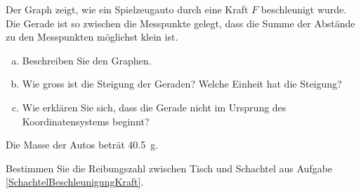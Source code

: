 \documentclass[12pt,a4paper,twoside]{article}
\def\dir{./Aufgaben_Mechanik/}
\newcommand{\Einbinden}[1]{}
\begin{document}
\begin{center}

\end{center}

\begin{aufgabe}
Der Graph zeigt, wie ein Spielzeugauto durch eine Kraft $F$ beschleunigt wurde.
Die Gerade ist so zwischen die Messpunkte gelegt, dass die Summe der Abstände zu den Messpunkten möglichst klein ist.

\begin{enumerate} [a)]
	\item Beschreiben Sie den Graphen.
	\item Wie gross ist die Steigung der Geraden? Welche Einheit hat die Steigung?
	\item Wie erklären Sie sich, dass die Gerade nicht im Ursprung des Koordinatensystems beginnt?
\end{enumerate}
Die Masse der Autos beträt \SI{40.5}{g}.

\end{aufgabe}

\Einbinden{\dir/dynamik02.tex}
\Einbinden{\dir/newton02.tex}
\Einbinden{\dir/newton03.tex}

\newpage

\begin{aufgabe}
	Bestimmen Sie die Reibungszahl zwischen Tisch und Schachtel aus Aufgabe \ref{SchachtelBeschleunigungKraft}.
\end{aufgabe}

\Einbinden{\dir/reibung05.tex}
\Einbinden{\dir/reibung06.tex}
\Einbinden{\dir/reibung04.tex}
\Einbinden{\dir/reibung07.tex}
\end{document}
